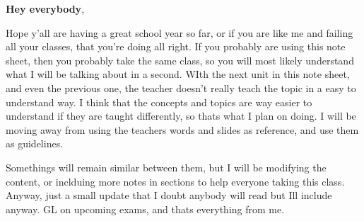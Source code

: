 \newpage
{}

\textbf{Hey everybody},

Hope y'all are having a great school year so far, or if you are like me and failing all your classes, that you're doing all right. If you probably are using this note sheet, then you probably take the same class, so you will most likely understand what I will be talking about in a second. WIth the next unit in this note sheet, and even the previous one, the teacher doesn't really teach the topic in a easy to understand way. I think that the concepts and topics are way easier to understand if they are taught differently, so thats what I plan on doing. I will be moving away from using the teachers words and slides as reference, and use them as guidelines. 

Somethings will remain similar between them, but I will be modifying the content, or inclduing more notes in sections to help everyone taking this class. Anyway, just a small update that I doubt anybody will read but Ill include anyway. GL on upcoming exams, and thats everything from me. 

